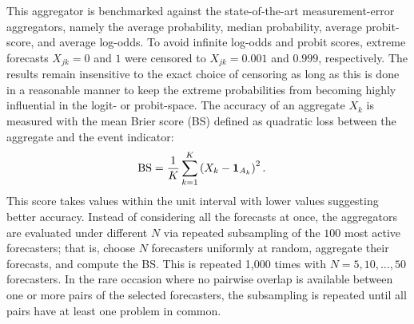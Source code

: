 \documentclass[11pt]{article}
\theoremstyle{definition}
\theoremstyle{definition}
\def\one{{\bf 1}}
\begin{document}
This aggregator is benchmarked against the state-of-the-art measurement-error aggregators, namely the average probability, median probability, average probit-score, and average log-odds. To avoid infinite log-odds
and probit scores, extreme forecasts $X_{jk} = 0$ and $1$ were
censored to $X_{jk} = 0.001$ and $0.999$, respectively. The results remain insensitive to the exact choice of censoring as long as this is done in a reasonable manner to keep the extreme probabilities from becoming highly influential in the logit- or probit-space. The accuracy of an aggregate $X_k$ is measured with the mean Brier score (BS) defined as quadratic loss between the aggregate and the event indicator:
 \begin{align*}
\text{BS} &= \frac{1}{K} \sum_{k=1}^K \left(X_k- \one_{A_k}\right)^2.
 \end{align*}
This score takes values within the unit interval with lower values suggesting better accuracy. Instead of considering all the forecasts at once, the aggregators are evaluated under different $N$ via repeated subsampling of the $100$ most active forecasters; that is, choose $N$ forecasters uniformly at random, aggregate their forecasts, and compute the BS. This is repeated 1,000 times with $N = 5, 10, \dots, 50$ forecasters. In the rare occasion where no pairwise overlap is available between one or more pairs of the selected forecasters, the subsampling is repeated until all pairs have at least one problem in common. 
\end{document}
